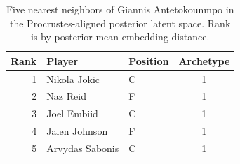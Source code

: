 \begin{table}[htbp]
  \centering\small
  \begin{tabular}{rllc}
    \toprule
    Rank & Player & Position & Archetype \\
    \midrule
    1 & Nikola Jokic & C & 1 \\
    2 & Naz Reid & F & 1 \\
    3 & Joel Embiid & C & 1 \\
    4 & Jalen Johnson & F & 1 \\
    5 & Arvydas Sabonis & C & 1 \\
    \bottomrule
  \end{tabular}
  \caption{Five nearest neighbors of Giannis Antetokounmpo in the Procrustes-aligned posterior latent space. Rank is by posterior mean embedding distance.}
  \label{tab:Giannis_Antetokounmpo_neighbors}
\end{table}

